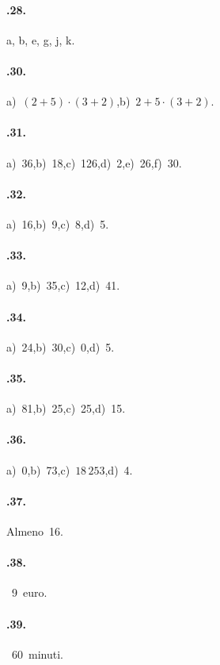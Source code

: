\paragraph{\thechapter.28.}
a, b, e, g, j, k.

\paragraph{\thechapter.30.}
a)~$ (2+5)\cdot(3+2) $,\quad b)~$ 2+5\cdot(3+2) $.

\paragraph{\thechapter.31.}
a)~36,\quad b)~18,\quad c)~126,\quad d)~2,\quad e)~26,\quad f)~30.

\paragraph{\thechapter.32.}
a)~16,\quad b)~9,\quad c)~8,\quad d)~5.

\paragraph{\thechapter.33.}
a)~9,\quad b)~35,\quad c)~12,\quad d)~41.

\paragraph{\thechapter.34.}
a)~24,\quad b)~30,\quad c)~0,\quad d)~5.

\paragraph{\thechapter.35.}
a)~81,\quad b)~25,\quad c)~25,\quad d)~15.

\paragraph{\thechapter.36.}
a)~0,\quad b)~73,\quad c)~$18\,253$,\quad d)~4.
\begin{multicols}{3}
\paragraph{\thechapter.37.}
Almeno~16.

\paragraph{\thechapter.38.}~9~euro.

\paragraph{\thechapter.39.}~60~minuti.
\end{multicols}
